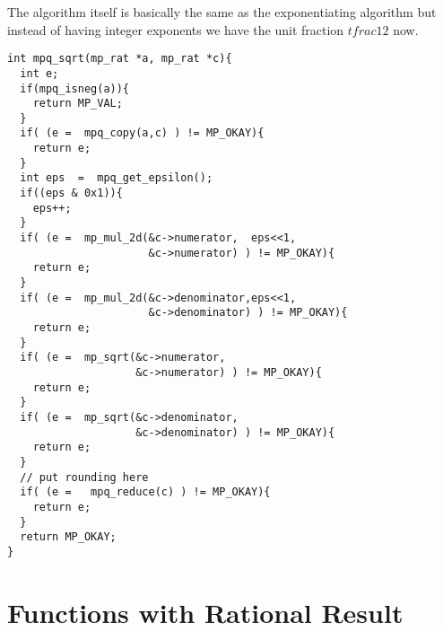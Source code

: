 \documentclass[10pt]{book}
\theoremstyle{definition}
\theoremstyle{remark}
\begin{document}
The algorithm itself is basically the same as the exponentiating algorithm but
instead of having integer exponents we have the unit fraction $tfrac{1}{2}$ now.
 \begin{center}
    \begin{lstlisting}[caption={Square Root},label=sqrootrat]
int mpq_sqrt(mp_rat *a, mp_rat *c){
  int e;
  if(mpq_isneg(a)){
    return MP_VAL;
  }
  if( (e =  mpq_copy(a,c) ) != MP_OKAY){
    return e;
  }
  int eps  =  mpq_get_epsilon();
  if((eps & 0x1)){
    eps++;
  }
  if( (e =  mp_mul_2d(&c->numerator,  eps<<1,
                      &c->numerator) ) != MP_OKAY){
    return e;
  }
  if( (e =  mp_mul_2d(&c->denominator,eps<<1,
                      &c->denominator) ) != MP_OKAY){
    return e;
  }
  if( (e =  mp_sqrt(&c->numerator,
                    &c->numerator) ) != MP_OKAY){
    return e;
  }
  if( (e =  mp_sqrt(&c->denominator,
                    &c->denominator) ) != MP_OKAY){
    return e;
  }
  // put rounding here
  if( (e =   mpq_reduce(c) ) != MP_OKAY){
    return e;
  }
  return MP_OKAY;
}
    \end{lstlisting}
  \end{center}


\chapter{Functions with Rational Result}
\end{document}
